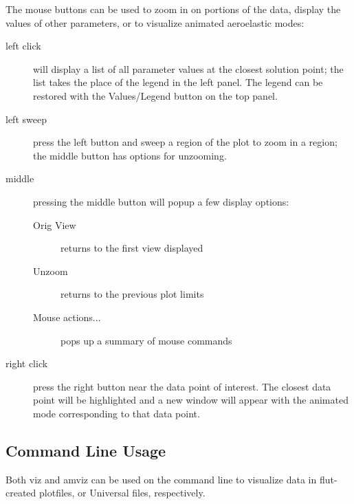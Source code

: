 \documentclass[11pt,openany,twoside]{book}
\numberwithin{equation}{section}		%
\newcommand{\Cmd}[1]{{\sf #1}}
\newcommand{\Sectref}[1]{\S\ref{#1}}
\newcommand{\Tableref}[1]{Table \ref{#1}}
\begin{document}
The mouse buttons can be used to zoom in on portions of the data,
display the values of other parameters,
or to visualize animated aeroelastic modes:
\begin{description}
\item[left click] will display a list of all parameter values at
	the closest solution point; the list takes the place of the legend
	in the left panel. The legend can be restored with the Values/Legend
	button on the top panel.

\item[left sweep] press the left button and sweep a region
of the plot to zoom in a region; the middle button has options for unzooming.
                
\item[middle] pressing the middle button will popup a few display options:
	\begin{description}
		\item[Orig View] returns to the first view displayed
		\item[Unzoom] returns to the previous plot limits
		\item[Mouse actions...] pops up a summary of mouse commands
	\end{description}
\item[right click] press the right button near the
data point of interest. The closest data point will be
highlighted and a new window will appear with the animated mode
corresponding to that data point.
\end{description}



\subsection{Command Line Usage} \label{ref:viz-cmdline}
Both \Cmd{viz} and \Cmd{amviz} can be used on the command line
to visualize data in \Cmd{flut}-created plotfiles,
or Universal files, respectively.
\end{document}
